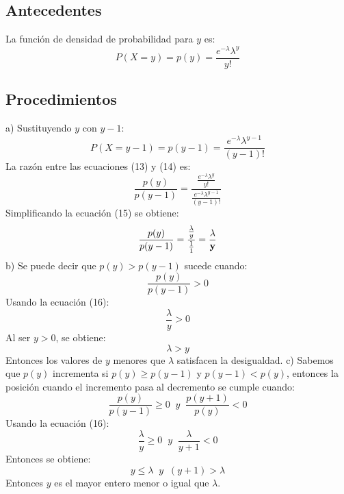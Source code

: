 \documentclass[12pt,letterpaper]{article}
\begin{document}
\subsection{Antecedentes}
La función de densidad de probabilidad para $y$ es: 
\begin{equation}
    P\left( X=y \right) =p(y)= \frac{{e^{ - \lambda } \lambda ^y }}{{y!}}
\end{equation}
\subsection{Procedimientos}
a) Sustituyendo $y$ con $y-1$:
\begin{equation}
    P\left( X=y-1 \right) =p(y-1)= \frac{{e^{ - \lambda } \lambda ^{y-1} }}{{(y-1)!}}
\end{equation}
La razón entre las ecuaciones (13) y (14) es:
\begin{equation}
    \frac{p(y)}{p(y-1)}=\frac{ \frac{{e^{ - \lambda } \lambda ^y }}{{y!}}}{\frac{{e^{ - \lambda } \lambda ^{y-1} }}{{(y-1)!}}}
\end{equation}
Simplificando la ecuación (15) se obtiene: 
\begin{equation}
    \frac{p(y)}{p(y-1)}=\frac{\frac{\lambda}{y}}{\frac{1}{1}}= {\bf \frac{\lambda}{y}}
\end{equation}
b) Se puede decir que $p(y)>p(y-1)$ sucede cuando:
\begin{equation}
\frac{p(y)}{p(y-1)}>0
\end{equation}
Usando la ecuación (16):
\begin{equation}
\frac{\lambda}{y}>0
\end{equation}
Al ser $y>0$, se obtiene:
\begin{equation}
\lambda>y
\end{equation}
Entonces los valores de $y$ menores que $\lambda$ satisfacen la desigualdad.\newline \newline
c) Sabemos que $p(y)$ incrementa si $p(y) \geq p(y-1) $ y $p(y-1)<p(y)$, entonces la posición cuando el incremento pasa al decremento se cumple cuando:
\begin{equation}
\frac{p(y)}{p(y-1)} \geq 0 \; \; y \; \; \frac{p(y+1)}{p(y)}<0
\end{equation}
Usando la ecuación (16):
\begin{equation}
\frac{\lambda}{y} \geq 0 \; \; y \; \; \frac{\lambda}{y+1}<0
\end{equation}
Entonces se obtiene: 
\begin{equation}
y \leq \lambda \; \; y \; \; (y+1)>\lambda
\end{equation}
Entonces $y$ es el mayor entero menor o igual que $\lambda$.
\newpage
\end{document}
